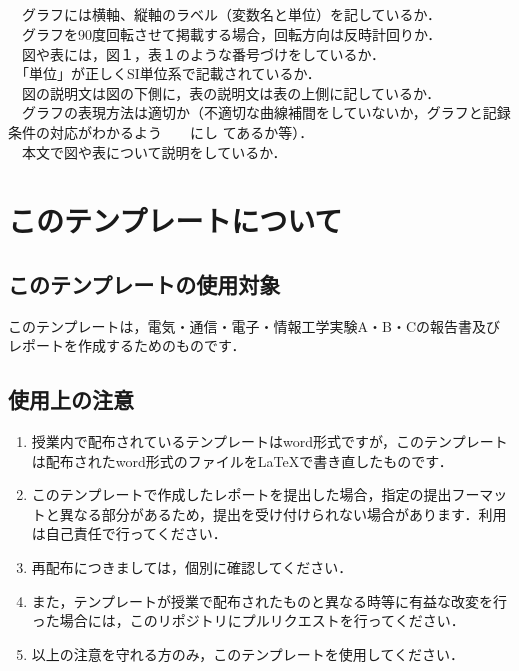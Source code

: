 \documentclass[a4paper]{ltjsarticle}
\renewcommand{\baselinestretch}{1}\selectfont
\newcommand{\done}{\rlap{$\square$}{\raisebox{0.2em}{\large\hspace{0.1em}\checkmark}}%
\hspace{-0.25em}}
\begin{document}
　　　　{\fontsize{9pt}{9pt}\selectfont{[2] 著者名，書名，編者名，発行所，発行年．}}\\
　　{\fontsize{10pt}{10pt}\selectfont{$\bigcirc$　著書の一部を引用する場合：　}}\\
　　　　{\fontsize{9pt}{9pt}\selectfont{[3] 著者名，"標題，" 書名，編者名，章番号またはpp.を付けて始め－終りのページ，発行所，発行年．}}\\
\\
\done　グラフには横軸、縦軸のラベル（変数名と単位）を記しているか．\\
\done　グラフを90度回転させて掲載する場合，回転方向は反時計回りか．\\
\done　図や表には，図１，表１のような番号づけをしているか．\\
\done　「単位」が正しくSI単位系で記載されているか．\\
\done　図の説明文は図の下側に，表の説明文は表の上側に記しているか．\\
\done　グラフの表現方法は適切か（不適切な曲線補間をしていないか，グラフと記録条件の対応がわかるよう　　にし
てあるか等）．\\
\done　本文で図や表について説明をしているか．\\

\newpage
\fontsize{10.5pt}{10.5pt}\selectfont
\renewcommand{\baselinestretch}{1.65}\selectfont

\section{このテンプレートについて}
\subsection{このテンプレートの使用対象}
このテンプレートは，電気・通信・電子・情報工学実験A・B・Cの報告書及びレポートを作成するためのものです．

\subsection{使用上の注意}
\begin{enumerate}
\item 授業内で配布されているテンプレートはword形式ですが，このテンプレートは配布されたword形式のファイルを\LaTeX で書き直したものです．

\item このテンプレートで作成したレポートを提出した場合，指定の提出フーマットと異なる部分があるため，提出を受け付けられない場合があります．利用は自己責任で行ってください．

\item 再配布につきましては，個別に確認してください．

\item また，テンプレートが授業で配布されたものと異なる時等に有益な改変を行った場合には，このリポジトリにプルリクエストを行ってください．

\item 以上の注意を守れる方のみ，このテンプレートを使用してください．
\end{enumerate}
\end{document}
